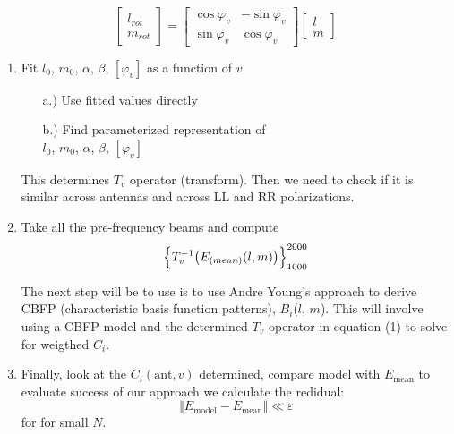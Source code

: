 \documentclass[12pt, a4paper]{article}%
\theoremstyle{plain}
\begin{document}
\begin{enumerate}
\begin{equation}
\left[\begin{array}{cc}
l_{rot} \\ m_{rot}
\end{array}\right]
=
\left[\begin{array}{cc}
\cos\varphi_v & -\sin\varphi_v \\\sin\varphi_v & \cos\varphi_v
\end{array}\right]
\left[\begin{array}{cc}
l \\  m
\end{array}\right]
\end{equation} 
\end{enumerate}	
	 
\begin{enumerate}
\item Fit $l_0$, $m_0$, $\alpha$, $\beta$, $[\varphi_v]$ as a function of $v$
\begin{enumerate}
\item[a.)] Use fitted values directly
\item[b.)] Find parameterized representation of\\
 $l_0$, $m_0$, $\alpha$, $\beta$, $[\varphi_v]$
\end{enumerate}
This determines $T_v$ operator (transform). Then we need to check if it is similar across antennas and across LL and RR polarizations.
\item 	 Take all the pre-frequency beams and compute
\begin{equation}
\Bigl\lbrace T_v^{-1}\bigl(E_{(mean)}(l, m)\bigl)\Bigl\rbrace_{1000}^{2000}
\end{equation}

The next step will be to use is to use Andre Young’s approach to derive CBFP (characteristic basis function patterns), $B_i$($l$, $m$). This will involve using a CBFP model and the determined $T_v$ operator in equation (1) to solve for weigthed  $C_i$. 

\item  Finally, look at the $C_i (\text{ant},v)$ determined, compare model with $E_{\text{mean}}$ to evaluate success of our approach we calculate the redidual:
	\begin{equation*}
	  \Vert E_{\text{model}}- E_{\text{mean}}\Vert \ll \varepsilon
	\end{equation*}
for for small $N$.
\end{enumerate}
\end{document}
